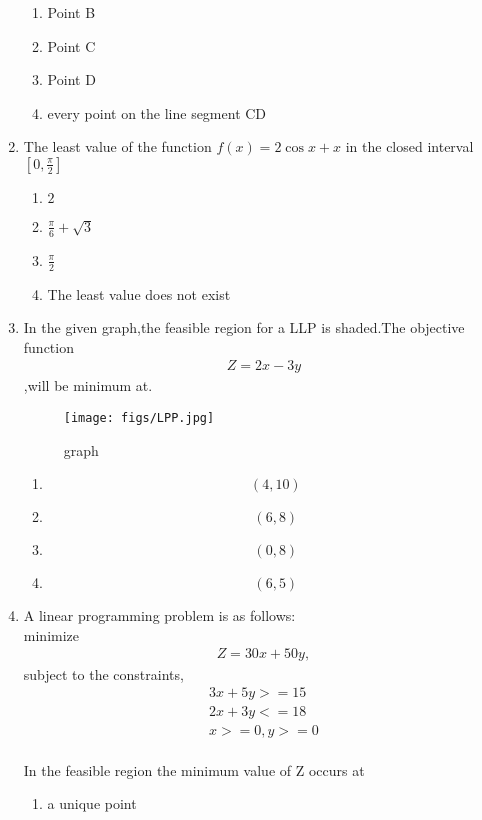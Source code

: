 \documentclass{article}
\begin{document}
\begin{enumerate}
		\begin{enumerate}[label=(\Alph*)]
			\item Point B
			\item Point C
			\item Point D
			\item every point on the line segment CD
		\end{enumerate}
	\item The least value of the function {$f(x) = 2\cos x + x$} in the closed interval$[0,\frac{\pi}{2}]$
		\begin{enumerate}[label=(\Alph*)]
			\item $2$
			\item $\frac{\pi}{6}+\sqrt{3}$
			\item $\frac{\pi}{2}$
			\item The least value does not exist
		\end{enumerate}
	\item In the given graph,the feasible region for a LLP is shaded.The objective function 
	\begin{align}
		 Z = 2x-3y
	\end{align}
		,will be minimum at.
		\begin{figure}[H]
		\centering
			\texttt{[image: figs/LPP.jpg]}
			\caption{graph}
			\label{fig:LPP.jpg}
		\end{figure}
		\begin{enumerate}%
			\item $$(4,10)$$
			\item $$(6,8)$$
			\item $$(0,8)$$
			\item $$(6,5)$$
		\end{enumerate}
	\item A linear programming problem is as follows:
		\\
		minimize 
	\begin{align}
		  Z = 30x+50y,
	\end{align}
		subject to the constraints,
	\begin{align}
		  3x+5y>=15
		\\ 2x+3y<=18
		\\ x>=0,y>=0
	\end{align}
	\\	In the feasible region the minimum value of Z occurs at
		\\
		\begin{enumerate}[label = (\Alph*)]
			\item a unique point

\end{enumerate}
\end{enumerate}
\end{document}
